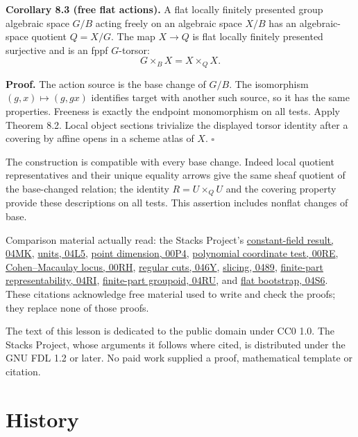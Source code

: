 \documentclass[11pt,a4paper,openany]{report}
\newcounter{none}
\begin{document}
\textbf{Corollary 8.3 (free flat actions).} A flat locally finitely presented group algebraic space \(G/B\) acting freely on an algebraic space \(X/B\) has an algebraic-space quotient \(Q=X/G\). The map \(X\to Q\) is flat locally finitely presented surjective and is an fppf \(G\)-torsor: \[
  G\times_B X=X\times_Q X.
  \]

\textbf{Proof.} The action source is the base change of \(G/B\). The isomorphism \((g,x)\mapsto(g,gx)\) identifies target with another such source, so it has the same properties. Freeness is exactly the endpoint monomorphism on all tests. Apply Theorem 8.2. Local object sections trivialize the displayed torsor identity after a covering by affine opens in a scheme atlas of \(X\). \(\square\)

The construction is compatible with every base change. Indeed local quotient representatives and their unique equality arrows give the same sheaf quotient of the base-changed relation; the identity \(R=U\times_Q U\) and the covering property provide these descriptions on all tests. This assertion includes nonflat changes of base.

Comparison material actually read: the Stacks Project's \href{https://stacks.math.columbia.edu/tag/04MK}{constant-field result, 04MK}, \href{https://stacks.math.columbia.edu/tag/04L5}{units, 04L5}, \href{https://stacks.math.columbia.edu/tag/00P4}{point dimension, 00P4}, \href{https://stacks.math.columbia.edu/tag/00RE}{polynomial coordinate test, 00RE}, \href{https://stacks.math.columbia.edu/tag/00RH}{Cohen--Macaulay locus, 00RH}, \href{https://stacks.math.columbia.edu/tag/046Y}{regular cuts, 046Y}, \href{https://stacks.math.columbia.edu/tag/0489}{slicing, 0489}, \href{https://stacks.math.columbia.edu/tag/04RI}{finite-part representability, 04RI}, \href{https://stacks.math.columbia.edu/tag/04RU}{finite-part groupoid, 04RU}, and \href{https://stacks.math.columbia.edu/tag/04S6}{flat bootstrap, 04S6}. These citations acknowledge free material used to write and check the proofs; they replace none of those proofs.

The text of this lesson is dedicated to the public domain under CC0 1.0. The Stacks Project, whose arguments it follows where cited, is distributed under the GNU FDL 1.2 or later. No paid work supplied a proof, mathematical template or citation.

\section{History}\label{AG-RG-S07-history}
\end{document}
